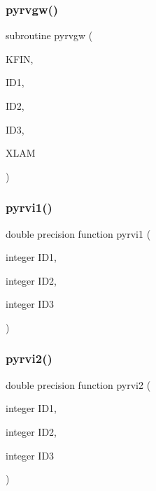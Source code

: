 \mbox{\label{pythia-6_84_824_8f_a615871b7d284b85342c32545140f6435}} 
\subsubsection{\texorpdfstring{pyrvgw()}{pyrvgw()}}
{\footnotesize\ttfamily subroutine pyrvgw (\begin{DoxyParamCaption}\item[{}]{K\+F\+IN,  }\item[{}]{I\+D1,  }\item[{}]{I\+D2,  }\item[{}]{I\+D3,  }\item[{}]{X\+L\+AM }\end{DoxyParamCaption})}

\mbox{\label{pythia-6_84_824_8f_a42b2d221de531f661ead0e1bef14807b}} 
\subsubsection{\texorpdfstring{pyrvi1()}{pyrvi1()}}
{\footnotesize\ttfamily double precision function pyrvi1 (\begin{DoxyParamCaption}\item[{integer}]{I\+D1,  }\item[{integer}]{I\+D2,  }\item[{integer}]{I\+D3 }\end{DoxyParamCaption})}

\mbox{\label{pythia-6_84_824_8f_a9e6ea2faa5ba1af425bd3782c8069d02}} 
\subsubsection{\texorpdfstring{pyrvi2()}{pyrvi2()}}
{\footnotesize\ttfamily double precision function pyrvi2 (\begin{DoxyParamCaption}\item[{integer}]{I\+D1,  }\item[{integer}]{I\+D2,  }\item[{integer}]{I\+D3 }\end{DoxyParamCaption})}

